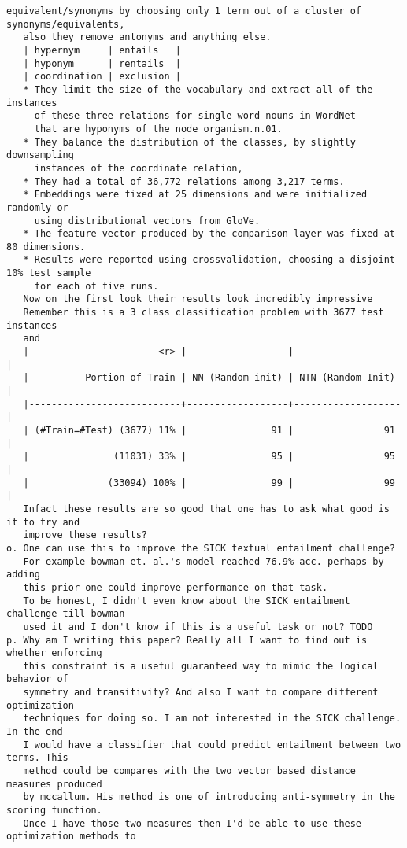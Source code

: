 \documentclass[12pt]{exam} %
\begin{document}
{\begin{Verbatim}[fontsize=\small]
   equivalent/synonyms by choosing only 1 term out of a cluster of synonyms/equivalents,
   also they remove antonyms and anything else.
   | hypernym     | entails   |
   | hyponym      | rentails  |
   | coordination | exclusion |
   * They limit the size of the vocabulary and extract all of the instances
     of these three relations for single word nouns in WordNet
     that are hyponyms of the node organism.n.01.
   * They balance the distribution of the classes, by slightly downsampling
     instances of the coordinate relation,
   * They had a total of 36,772 relations among 3,217 terms.
   * Embeddings were fixed at 25 dimensions and were initialized randomly or
     using distributional vectors from GloVe.
   * The feature vector produced by the comparison layer was fixed at 80 dimensions.
   * Results were reported using crossvalidation, choosing a disjoint 10% test sample
     for each of five runs.
   Now on the first look their results look incredibly impressive
   Remember this is a 3 class classification problem with 3677 test instances
   and
   |                       <r> |                  |                   |
   |          Portion of Train | NN (Random init) | NTN (Random Init) |
   |---------------------------+------------------+-------------------|
   | (#Train=#Test) (3677) 11% |               91 |                91 |
   |               (11031) 33% |               95 |                95 |
   |              (33094) 100% |               99 |                99 |
   Infact these results are so good that one has to ask what good is it to try and
   improve these results?
o. One can use this to improve the SICK textual entailment challenge?
   For example bowman et. al.'s model reached 76.9% acc. perhaps by adding
   this prior one could improve performance on that task.
   To be honest, I didn't even know about the SICK entailment challenge till bowman
   used it and I don't know if this is a useful task or not? TODO
p. Why am I writing this paper? Really all I want to find out is whether enforcing
   this constraint is a useful guaranteed way to mimic the logical behavior of
   symmetry and transitivity? And also I want to compare different optimization
   techniques for doing so. I am not interested in the SICK challenge. In the end
   I would have a classifier that could predict entailment between two terms. This
   method could be compares with the two vector based distance measures produced
   by mccallum. His method is one of introducing anti-symmetry in the scoring function.
   Once I have those two measures then I'd be able to use these optimization methods to

\end{Verbatim}}
\end{document}
